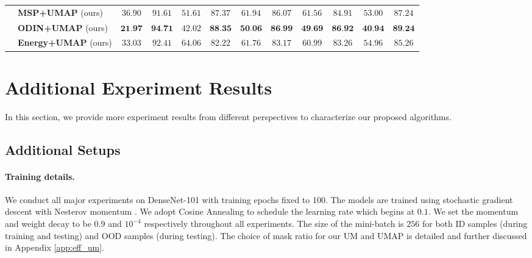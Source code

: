 \documentclass{article}
\theoremstyle{plain}
\theoremstyle{definition}
\theoremstyle{remark}
\begin{document}
\begin{table*}[t!]
{\begin{tabular}{c|l|cccccccc|cc}
         \cmidrule{2-12}
         & \textbf{MSP+UMAP} (ours) & $36.90$ & $91.61$ & $51.61$ & $87.37$ & $61.94$ & $86.07$ & $61.56$ & $84.91$ & $53.00$ & $87.24$\\
         & \textbf{ODIN+UMAP} (ours) & $\textbf{21.97}$ & $\textbf{94.71}$ & $42.02$ & $\textbf{88.35}$ & $\textbf{50.06}$ & $\textbf{86.99}$ & $\textbf{49.69}$ & $\textbf{86.92}$ & $\textbf{40.94}$ & $\textbf{89.24}$\\
         & \textbf{Energy+UMAP} (ours) & $33.03$ & $92.41$ & $64.06$ & $82.22$ & $61.76$ & $83.17$ & $60.99$ & $83.26$ & $54.96$ & $85.26$\\
         
        \bottomrule[1.5pt]
    \end{tabular}}
    \label{tab:my_imagenet}
\end{table*}


\clearpage

\section{Additional Experiment Results}
\label{app:additional_exp_results}

In this section, we provide more experiment results from different perspectives to characterize our proposed algorithms. 



\subsection{Additional Setups}
\label{app:additional_exp_setup}


\paragraph{Training details.} We conduct all major experiments on DenseNet-101 \citep{huang2017densely} with training epochs fixed to 100. The models are trained using stochastic gradient descent \citep{1177729392} with Nesterov momentum \citep{JMLR:v12:duchi11a}. We adopt Cosine Annealing \citep{LoshchilovH17} to schedule the learning rate which begins at $0.1$. We set the momentum and weight decay to be $0.9$ and $10^{-4}$ respectively throughout all experiments. The size of the mini-batch is $256$ for both ID samples (during training and testing) and OOD samples (during testing). The choice of mask ratio for our UM and UMAP is detailed and further discussed in Appendix \ref{app:eff_um}.
\end{document}
